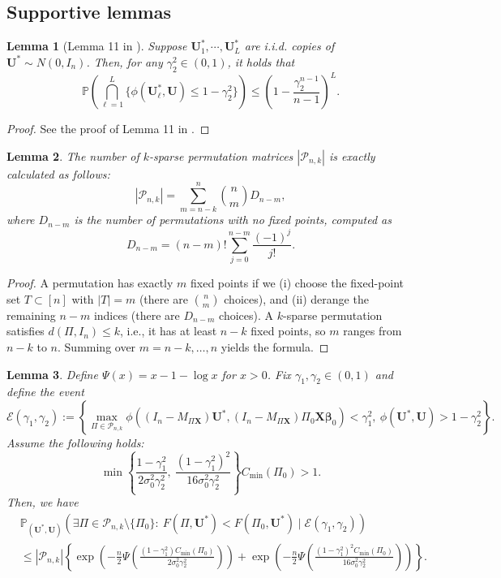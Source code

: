 \documentclass[11pt, reqno]{amsart}
\newcommand{\bP}{\mathbb{P}}
\renewcommand{\le}{\leqslant}
\newcommand{\mP}{\mathcal{P}}
\newcommand{\1}{\mbox{1}\hspace{-0.25em}\mbox{l}}
\theoremstyle{definition}\newtheorem{problem}{Problem}[section]
\theoremstyle{definition}\newtheorem{definition}[problem]{Definition}
\theoremstyle{remark}\newtheorem{assumption}{Assumption}
\theoremstyle{remark}\newtheorem{remark}[problem]{Remark}
\theoremstyle{definition}\newtheorem{example}[problem]{Example}
\theoremstyle{plain}\newtheorem{theorem}[problem]{Theorem}
\theoremstyle{plain}\newtheorem{question}[problem]{Question}
\theoremstyle{plain}\newtheorem{lemma}[problem]{Lemma}
\theoremstyle{plain}\newtheorem{proposition}[problem]{Proposition}
\theoremstyle{plain}\newtheorem{corollary}[problem]{Corollary}
\theoremstyle{plain}\newtheorem{conjecture}[problem]{Conjecture}
\begin{document}
\subsection{Supportive lemmas}
\begin{lemma}[Lemma 11 in \cite{wang2022finite}]\label{lem:similarity measure}
    Suppose $\bm{U}_1^*, \cdots, \bm{U}_L^*$ are i.i.d. copies of $\bm{U}^* \sim N(0, I_n)$. Then, for any $\gamma_2^2 \in (0,1)$, it holds that
    \begin{equation}
    \bP\left( \bigcap_{\ell = 1}^{L} \{ \phi(\bm{U}^*_\ell, \bm{U}) \le 1 - \gamma_2^2 \} \right) \le \left( 1- \frac{\gamma_2^{n-1}}{n-1} \right)^L. 
    \end{equation}
\end{lemma}
\begin{proof}
    See the proof of Lemma 11 in \cite{wang2022finite}.
\end{proof}
\begin{lemma}\label{lem:k-sparse permutation}
    The number of $k$-sparse permutation matrices $|\mP_{n,k}|$ is exactly calculated as follows:
    \begin{equation}
        |\mP_{n,k}| = \sum_{m = n - k}^{n} \binom{n}{m} D_{n - m},
    \end{equation}
    where $D_{n-m}$ is the number of permutations with no fixed points, computed as
    \[
D_{n-m} = (n-m)! \sum_{j=0}^{n-m} \frac{(-1)^j}{j!}.
\]
\end{lemma}
\begin{proof}
A permutation has exactly $m$ fixed points if we (i) choose the fixed-point set $T\subset[n]$ with $|T|=m$ (there are $\binom{n}{m}$ choices),
and (ii) derange the remaining $n-m$ indices (there are $D_{n-m}$ choices).
A $k$-sparse permutation satisfies $d(\Pi,I_n)\le k$, i.e., it has at least $n-k$ fixed points, so $m$ ranges from $n-k$ to $n$.
Summing over $m=n-k,\dots,n$ yields the formula.
\end{proof}

\begin{lemma}\label{lem:F-union}
Define $\Psi(x)=x-1-\log x$ for $x>0$. Fix $\gamma_1,\gamma_2\in(0,1)$ and define the event
\[
\mathcal E(\gamma_1,\gamma_2)
:=
\left\{
\max_{\Pi\in\mP_{n,k}}
\phi\left((I_n-M_{\Pi\bm X})\bm U^*, (I_n-M_{\Pi\bm X})\Pi_0\bm X\bm\beta_0\right)
<\gamma_1^2,\ 
\phi(\bm U^*,\bm U)>1-\gamma_2^2
\right\}.
\]
Assume the following holds:
\[
\min\left\{
\frac{1-\gamma_1^2}{2\sigma_0^2\gamma_2^2},\
\frac{(1-\gamma_1^2)^2}{16\sigma_0^2\gamma_2^2}
\right\}C_{\min}(\Pi_0)>1.
\]
Then, we have
\begin{align*}
&\bP_{(\bm U^*,\bm U)}\left(
\exists\Pi\in\mP_{n,k}\setminus\{\Pi_0\}:\ 
F(\Pi,\bm U^*)<F(\Pi_0,\bm U^*)
\mid 
\mathcal E(\gamma_1,\gamma_2)
\right)\\
&\le
|\mP_{n,k}|\left\{
\exp\left( -\frac{n}{2}\Psi\left( \frac{(1-\gamma_1^2)C_{\min}(\Pi_0)}{2\sigma_0^2\gamma_2^2}\right)\right)
+\exp\left( -\frac{n}{2}\Psi\left( \frac{(1-\gamma_1^2)^2C_{\min}(\Pi_0)}{16\sigma_0^2\gamma_2^2}\right)\right)
\right\}.
\end{align*}
\end{lemma}
\end{document}
